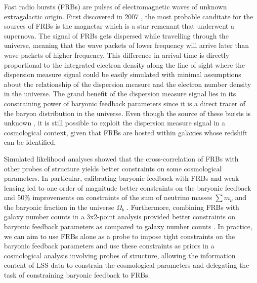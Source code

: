 Fast radio bursts (FRBs) are pulses of electromagnetic waves of unknown extragalactic origin. First discovered in 2007 \citep{Lorimer_Bailes_McLaughlin_Narkevic_Crawford_2007}, the most probable canditate for the sources of FRBs is the magnetar which is a star remenant that underwent a supernova. The signal of FRBs gets dispersed while travelling through the universe, meaning that the wave packets of lower frequency will arrive later than wave packets of higher frequency. This difference in arrival time is directly proportional to the integrated electron density along the line of sight where the dispersion measure signal could be easily simulated with minimal assumptions about the relationship of the dispersion measure and the electron number density in the universe. The grand benefit of the dispersion measure signal lies in its constraining power of baryonic feedback parameters since it is a direct tracer of the baryon distribution in the universe. Even though the source of these bursts is unknown \citep{Petroff_2019}, it is still possible to exploit the dispersion measure signal in a cosmological context, given that FRBs are hosted within galaxies whose redshift can be identified.

Simulated likelihood analyses showed that the cross-correlation of FRBs with other probes of structure yields better constraints on some cosmological parameters. In particular, calibrating baryonic feedback with FRBs and weak lensing led to one order of magnitude better constraints on the baryonic feedback and 50\% improvements on constraints of the sum of neutrino masses $ \sum m_\nu$ and the baryonic fraction in the universe $\Omega_b$ \citep{reischke2023calibrating}. Furthermore, combining FRBs with galaxy number counts in a 3x2-point analysis provided better constraints on baryonic feedback parameters as compared to galaxy number counts \citep{Sharma_2026}. In practice, we can aim to use FRBs alone as a probe to impose tight constraints on the baryonic feedback parameters and use these constraints as priors in a cosmological analysis involving probes of structure, allowing the information content of LSS data to constrain the cosmological parameters and delegating the task of constraining baryonic feedback to FRBs.

